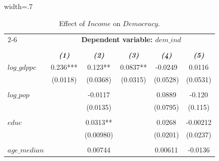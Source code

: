 \documentclass{article}
\begin{document}
\begin{table}[hp!]
\centering
\caption{Effect of $Income$ on $Democracy$.}\vspace{.25cm}
\begin{adjustbox}{width=.7\textwidth}
\begin{tabular}{l|ccccc|}
\cline{2-6}
                                  & \multicolumn{5}{c|}{\textbf{Dependent variable:  $dem\_ind$}}                                                               \\
                                  & \multicolumn{5}{c|}{}                                                               \\
\textbf{}                         & \textit{\textbf{(1)}}            & \textit{\textbf{(2)}}           & \textit{\textbf{(3)}}           & \textit{\textbf{(4)}}     & \textit{\textbf{(5)}}      \\ \hline
\multicolumn{1}{|l|}{$log\_gdppc$}  & 0.236***  & 0.123**  & 0.0837** & -0.0249 & 0.0116   \\
\multicolumn{1}{|l|}{}            & (0.0118)                           & (0.0368)                          & (0.0315)                          & (0.0528)  & (0.0531)   \\
\multicolumn{1}{|l|}{}            &       &    &           & &   \\
\multicolumn{1}{|l|}{$log\_pop$}    &                                  & -0.0117                         &                                 & 0.0889  & -0.120   \\
\multicolumn{1}{|l|}{}            &                                  & (0.0135)                          &                                 & (0.0795)  & (0.115)    \\
\multicolumn{1}{|l|}{}            &       &    &           & &   \\
\multicolumn{1}{|l|}{$educ$}        &                                  & 0.0313** &                                 & 0.0268  & -0.00212 \\
\multicolumn{1}{|l|}{}            &                                  & (0.00980)                         &                                 & (0.0201)  & (0.0237)   \\
\multicolumn{1}{|l|}{}            &       &    &           & &   \\
\multicolumn{1}{|l|}{$age\_median$} &                                  & 0.00744                         &                                 & 0.00611 & -0.0136  \\

\end{tabular}
\end{adjustbox}
\end{table}
\end{document}
